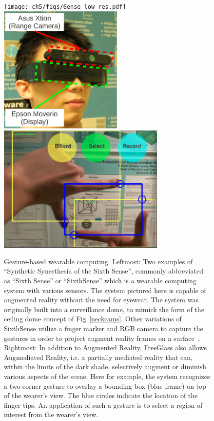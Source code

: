 \begin{figure}
\centering
{\texttt{[image: ch5/figs/6ense\_low\_res.pdf]}}
\includegraphics[height=2.5in]{ch5/figs/crop_wearable}
\includegraphics[height=2.5in]{ch5/figs/bounding_box.png} 
\caption{Gesture-based wearable computing.
Leftmost: Two examples of ``Synthetic Synesthesia of the Sixth Sense''\cite{mann2001cyborg},
commonly abbreviated as ``Sixth Sense'' or ``SixthSense'' which is a wearable
computing system with various sensors.  The system pictured here is
capable of augmented reality without the need for eyewear.
The system was originally built into a surveillance dome,
to mimick the form of the ceiling dome concept of
Fig~\protect\ref{neckcams}.
Other variations of SixthSense
utilize a finger marker and RGB camera to capture the gestures
in order to project augment reality frames
on a surface~\cite{mistry2009sixthsense}.
Rightmost: In addition to Augmented Reality,
FreeGlass also allows Augmediated Reality, i.e. a partially mediated reality
that can, within the limits of the dark shade, selectively augment or diminish
various aspects of the scene.
Here for example, the
system recognizes a two-corner gesture to overlay a bounding box (blue frame)
on top of the wearer's view. The blue circles indicate the location of the
finger tips. An application of such a gesture is to select a region
of interest from the wearer's view.} 
\label{bounding}
\label{6sense} 
\end{figure}

